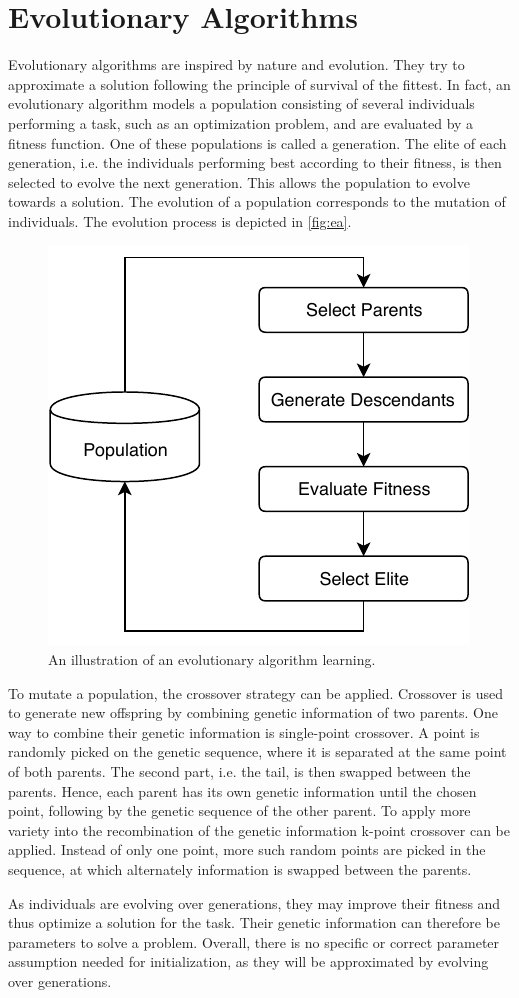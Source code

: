 \section{Evolutionary Algorithms}
\label{sec:ea}
Evolutionary algorithms are inspired by nature and evolution.
They try to approximate a solution following the principle of survival of the fittest.
In fact, an evolutionary algorithm models a population consisting of several individuals performing a task, such as an optimization problem, and are evaluated by a fitness function.
One of these populations is called a generation.
The elite of each generation, i.e. the individuals performing best according to their fitness, is then selected to evolve the next generation.
This allows the population to evolve towards a solution.
The evolution of a population corresponds to the mutation of individuals.
The evolution process is depicted in \autoref{fig:ea}.

\begin{figure}[h]
\centering
\includegraphics[width=.7\columnwidth]{figures/ea_fig.pdf}
\caption{An illustration of an evolutionary algorithm learning. \cite{Dillmann2017}}
\label{fig:ea}
\end{figure}

To mutate a population, the crossover strategy can be applied.
Crossover is used to generate new offspring by combining genetic information of two parents.
One way to combine their genetic information is single-point crossover.
A point is randomly picked on the genetic sequence, where it is separated at the same point of both parents.
The second part, i.e. the tail, is then swapped between the parents.
Hence, each parent has its own genetic information until the chosen point, following by the genetic sequence of the other parent.
To apply more variety into the recombination of the genetic information k-point crossover can be applied.
Instead of only one point, more such random points are picked in the sequence, at which alternately information is swapped between the parents.
\cite{Dillmann2017}

As individuals are evolving over generations, they may improve their fitness and thus optimize a solution for the task.
Their genetic information can therefore be parameters to solve a problem.
Overall, there is no specific or correct parameter assumption needed for initialization, as they will be approximated by evolving over generations.
